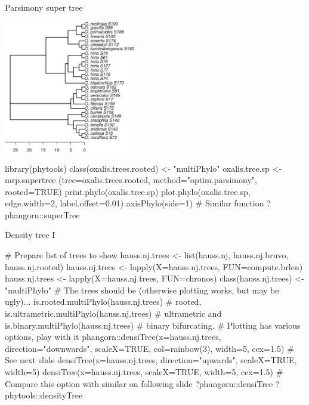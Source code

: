 \documentclass[compress, ucs, xelatex, 11pt, xcolor=svgnames,
	hyperref={
		bookmarks=true,
		unicode=true,
		colorlinks=true,
		pdftitle={Molecular data in R},
		plainpages=false,
		pdfauthor={Vojtech Zeisek},
		pdfsubject={Course about phylogeny and evolution in R},
		pdfcreator={XeLaTeX},
		pdfkeywords={R, evolution, phylogeny, molecular data},
		linkcolor=Tomato,
		anchorcolor=SaddleBrown,
		citecolor=Goldenrod,
		filecolor=DarkMagenta,
		menucolor=Sienna,
		urlcolor=DarkTurquoise,
		pdftex},
	url={hyphens, lowtilde} %
	]{beamer}
\begin{document}
\begin{frame}[fragile]{Parsimony super tree}
	\begin{multicols}{2}
		\begin{center}
			\includegraphics[height=5.75cm]{oxalis-pars.png}
		\end{center}
		\begin{spluscode}
    library(phytools)
    class(oxalis.trees.rooted) <-
      "multiPhylo"
    oxalis.tree.sp <- mrp.supertree
      (tree=oxalis.trees.rooted,
      method="optim.parsimony",
      rooted=TRUE)
    print.phylo(oxalis.tree.sp)
    plot.phylo(oxalis.tree.sp,
      edge.width=2, label.offset=0.01)
    axisPhylo(side=1)
    # Similar function
    ?phangorn::superTree
		\end{spluscode}
	\end{multicols}
\end{frame}

\begin{frame}[fragile]{Density tree I}
	\begin{spluscode}
    # Prepare list of trees to show
    hauss.nj.trees <- list(hauss.nj, hauss.nj.bruvo, hauss.nj.rooted)
    hauss.nj.trees <- lapply(X=hauss.nj.trees, FUN=compute.brlen)
    hauss.nj.trees <- lapply(X=hauss.nj.trees, FUN=chronos)
    class(hauss.nj.trees) <- "multiPhylo"
    # The trees should be (otherwise plotting works, but may be ugly)...
    is.rooted.multiPhylo(hauss.nj.trees) # rooted,
    is.ultrametric.multiPhylo(hauss.nj.trees) # ultrametric and
    is.binary.multiPhylo(hauss.nj.trees) # binary bifurcating.
    # Plotting has various options, play with it
    phangorn::densiTree(x=hauss.nj.trees, direction="downwards",
      scaleX=TRUE, col=rainbow(3), width=5, cex=1.5) # See next slide
    densiTree(x=hauss.nj.trees, direction="upwards", scaleX=TRUE, width=5)
    densiTree(x=hauss.nj.trees, scaleX=TRUE, width=5, cex=1.5)
    # Compare this option with similar on following slide
    ?phangorn::densiTree
    ?phytools::densityTree
	\end{spluscode}
\end{frame}
\end{document}
